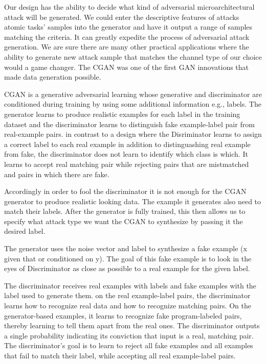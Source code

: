  Our design has the ability to decide what kind of adversarial microarchitectural attack will be generated. We could enter the descriptive features of attacks atomic tasks' samples into the generator and have it output a range of samples matching the criteria. It can greatly expedite the process of adversarial attack generation. We are sure there are many other practical applications where the ability to generate new attack sample that matches the channel type of our choice would a game changer. The CGAN was one of the first GAN innovations that made data generation possible. 
 
 CGAN is a generative adversarial learning whose generative and discriminator are conditioned during training by using some additional information e.g., labels. 
 The generator learns to produce realistic examples for each label in the training dataset and the discriminator learns to distinguish fake example-label pair from real-example pairs.   
 in contrast to a design where the Disriminator learns to assign a correct label to each real example in addition to distinguashing real example from fake, the discriminator does not learn to identify which class is which.  It learns to accept real matching pair while rejecting pairs that are mistmatched and pairs in which there are fake. 
 
 Accordingly in order to fool the discriminator it is not enough for the CGAN generator to produce realistic looking data. The example it generates also need to match their labels. After the generator is fully trained, this then allows us to specify what attack type we want the CGAN to synthesize by passing it the desired label. 
 
 The generator uses the noise vector and label to synthesize a fake example (x given that or conditioned on y). The goal of this fake example is to look in the eyes of Discriminator as close as possible to a real example for the given label.  
 
 
 
 The discriminator receives real examples with labels and fake examples with the label used to generate them. on the real example-label pairs, the discriminator learns how to recognize real data and how to recognize matching pairs. On the generator-based examples, it learns to recognize fake program-labeled pairs, thereby learning to tell them apart from the real ones. The discriminator outputs a single probability indicating its conviction that input is a real, matching pair. The discriminator's goal is to learn to reject all fake examples and all examples that fail to match their label, while accepting all real example-label pairs. 
 
